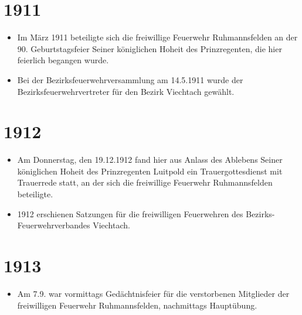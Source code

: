 \documentclass[12pt,a4paper]{book}
\begin{document}
\section*{1911}

\begin{itemize}
\item Im März 1911 beteiligte sich die freiwillige Feuerwehr
Ruhmannsfelden an der 90. Geburtstagsfeier Seiner königlichen Hoheit des
Prinzregenten, die hier feierlich begangen wurde.

\item Bei der Bezirksfeuerwehrversammlung am 14.5.1911 wurde der
Bezirksfeuerwehrvertreter für den Bezirk Viechtach gewählt.
\end{itemize}

\section*{1912}

\begin{itemize}
\item Am Donnerstag, den 19.12.1912 fand hier aus Anlass des Ablebens
Seiner königlichen Hoheit des Prinzregenten Luitpold ein
Trauergottesdienst mit Trauerrede statt, an der sich die freiwillige
Feuerwehr Ruhmannsfelden beteiligte.

\item 1912 erschienen Satzungen für die freiwilligen Feuerwehren des
Bezirks-Feuerwehrverbandes Viechtach.
\end{itemize}

\section*{1913}

\begin{itemize}
\item Am 7.9. war vormittags Gedächtnisfeier für die verstorbenen
Mitglieder der freiwilligen Feuerwehr Ruhmannsfelden, nachmittags
Hauptübung.
\end{itemize}
\end{document}
